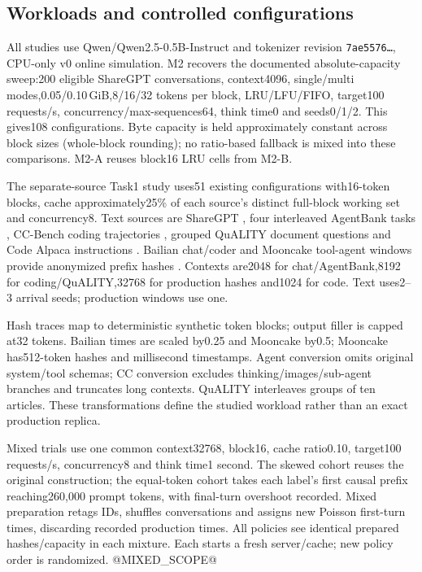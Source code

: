 \documentclass{article}
\begin{document}
\subsection{Workloads and controlled configurations}
All studies use Qwen/Qwen2.5-0.5B-Instruct and tokenizer revision \texttt{7ae5576\ldots}, CPU-only v0 online simulation. M2 recovers the documented absolute-capacity sweep:200 eligible ShareGPT conversations, context4096, single/multi modes,0.05/0.10\,GiB,8/16/32 tokens per block, LRU/LFU/FIFO, target100 requests/s, concurrency/max-sequences64, think time0 and seeds0/1/2. This gives108 configurations. Byte capacity is held approximately constant across block sizes (whole-block rounding); no ratio-based fallback is mixed into these comparisons. M2-A reuses block16 LRU cells from M2-B.

The separate-source Task1 study uses51 existing configurations with16-token blocks, cache approximately25\% of each source's distinct full-block working set and concurrency8. Text sources are ShareGPT \citep{sharegpt}, four interleaved AgentBank tasks \citep{agentbank}, CC-Bench coding trajectories \citep{ccbench}, grouped QuALITY document questions \citep{quality} and Code Alpaca instructions \citep{codealpaca}. Bailian chat/coder and Mooncake tool-agent windows provide anonymized prefix hashes \citep{bailian,mooncake}. Contexts are2048 for chat/AgentBank,8192 for coding/QuALITY,32768 for production hashes and1024 for code. Text uses2--3 arrival seeds; production windows use one.

Hash traces map to deterministic synthetic token blocks; output filler is capped at32 tokens. Bailian times are scaled by0.25 and Mooncake by0.5; Mooncake has512-token hashes and millisecond timestamps. Agent conversion omits original system/tool schemas; CC conversion excludes thinking/images/sub-agent branches and truncates long contexts. QuALITY interleaves groups of ten articles. These transformations define the studied workload rather than an exact production replica.

Mixed trials use one common context32768, block16, cache ratio0.10, target100 requests/s, concurrency8 and think time1 second. The skewed cohort reuses the original construction; the equal-token cohort takes each label's first causal prefix reaching260,000 prompt tokens, with final-turn overshoot recorded. Mixed preparation retags IDs, shuffles conversations and assigns new Poisson first-turn times, discarding recorded production times. All policies see identical prepared hashes/capacity in each mixture. Each starts a fresh server/cache; new policy order is randomized. @MIXED_SCOPE@
\end{document}
